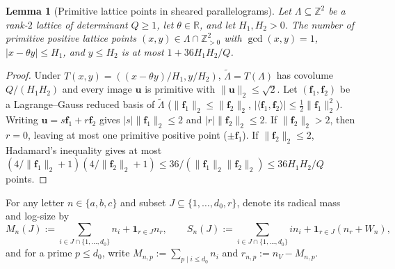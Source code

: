 \documentclass[11pt,a4paper]{amsart}
\theoremstyle{plain}
\newtheorem{lemma}[theorem]{Lemma}
\theoremstyle{definition}
\theoremstyle{remark}
\newcommand{\Z}{\mathbb{Z}}
\newcommand{\R}{\mathbb{R}}
\begin{document}
\begin{lemma}[Primitive lattice points in sheared parallelograms]\label{lem:lg}
Let $\Lambda \subseteq \Z^2$ be a rank-$2$ lattice of determinant $Q \ge 1$, let $\theta \in \R$, and let $H_1, H_2 > 0$. The number of primitive positive lattice points $(x,y) \in \Lambda \cap \Z_{>0}^2$ with $\gcd(x,y)=1$, $|x - \theta y| \le H_1$, and $y \le H_2$ is at most $1 + 36 H_1 H_2 / Q$.
\end{lemma}
\begin{proof}
Under $T(x,y) = ((x-\theta y)/H_1, y/H_2)$, $\tilde{\Lambda} = T(\Lambda)$ has covolume $Q/(H_1 H_2)$ and every image $\mathbf{u}$ is primitive with $\|\mathbf{u}\|_2 \le \sqrt{2}$. Let $(\mathbf{f}_1, \mathbf{f}_2)$ be a Lagrange--Gauss reduced basis of $\tilde{\Lambda}$ ($\|\mathbf{f}_1\|_2 \le \|\mathbf{f}_2\|_2$, $|\langle \mathbf{f}_1, \mathbf{f}_2\rangle| \le \frac{1}{2}\|\mathbf{f}_1\|_2^2$). Writing $\mathbf{u} = s \mathbf{f}_1 + r \mathbf{f}_2$ gives $|s|\|\mathbf{f}_1\|_2 \le 2$ and $|r|\|\mathbf{f}_2\|_2 \le 2$. If $\|\mathbf{f}_2\|_2 > 2$, then $r = 0$, leaving at most one primitive positive point ($\pm\mathbf{f}_1$). If $\|\mathbf{f}_2\|_2 \le 2$, Hadamard's inequality gives at most $(4/\|\mathbf{f}_1\|_2 + 1)(4/\|\mathbf{f}_2\|_2 + 1) \le 36/(\|\mathbf{f}_1\|_2\|\mathbf{f}_2\|_2) \le 36 H_1 H_2 / Q$ points.
\end{proof}

For any letter $n \in \{a,b,c\}$ and subset $J \subseteq \{1,\dots,d_0,r\}$, denote its radical mass and log-size by
\[
  M_n(J) := \sum_{i \in J \cap \{1,\dots,d_0\}} n_i + \mathbf{1}_{r \in J} n_r, \qquad
  S_n(J) := \sum_{i \in J \cap \{1,\dots,d_0\}} i n_i + \mathbf{1}_{r \in J}(n_r + W_n),
\]
and for a prime $p \le d_0$, write $M_{n,p} := \sum_{p \mid i \le d_0} n_i$ and $r_{n,p} := n_V - M_{n,p}$.
\end{document}
